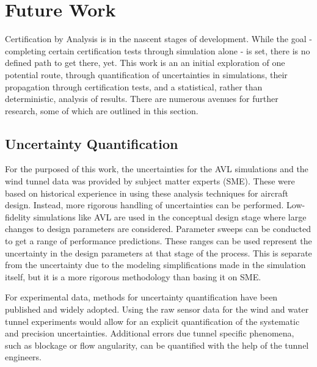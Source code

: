 


\section{Future Work}

Certification by Analysis is in the nascent stages of development.
While the goal - completing certain certification tests through simulation alone - is set, there is no defined path to get there, yet.
This work is an an initial exploration of one potential route, through quantification of uncertainties in simulations, their propagation through certification tests, and a statistical, rather than deterministic, analysis of results. 
There are numerous avenues for further research, some of which are outlined in this section. 

\subsection{Uncertainty Quantification}

For the purposed of this work, the uncertainties for the AVL simulations and the wind tunnel data was provided by subject matter experts (SME). 
These were based on historical experience in using these analysis techniques for aircraft design. 
Instead, more rigorous handling of uncertainties can be performed. 
Low-fidelity simulations like AVL are used in the conceptual design stage where large changes to design parameters are considered.
Parameter sweeps can be conducted to get a range of performance predictions. 
These ranges can be used represent the uncertainty in the design parameters at that stage of the process.
This is separate from the uncertainty due to the modeling simplifications made in the simulation itself, but it is a more rigorous methodology than basing it on SME.

For experimental data, methods for uncertainty quantification have been published \cite{coleman1995engineering} and widely adopted.
Using the raw sensor data for the wind and water tunnel experiments would allow for an explicit quantification of the systematic and precision uncertainties. 
Additional errors due tunnel specific phenomena, such as blockage or flow angularity, can be quantified with the help of the tunnel engineers.

